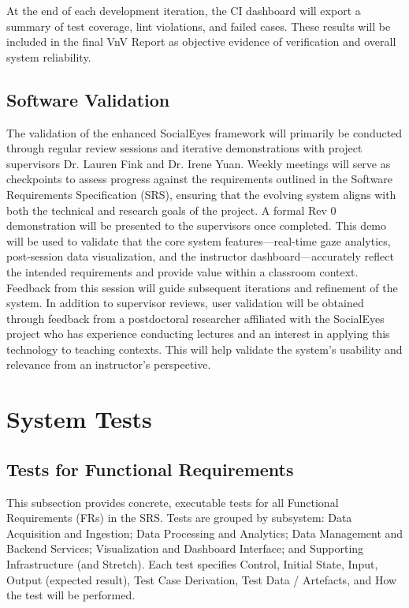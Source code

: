 \documentclass[12pt, titlepage]{article}
\begin{document}
At the end of each development iteration, the CI dashboard will export a summary of test coverage, lint violations, and failed cases. These results will be included in the final VnV Report as objective evidence of verification and overall system reliability.\\

\subsection{Software Validation}

The validation of the enhanced SocialEyes framework will primarily be conducted through regular review sessions and iterative demonstrations with project supervisors Dr. Lauren Fink and Dr. Irene Yuan. Weekly meetings will serve as checkpoints to assess progress against the requirements outlined in the Software Requirements Specification (SRS), ensuring that the evolving system aligns with both the technical and research goals of the project.
\newline
A formal Rev 0 demonstration will be presented to the supervisors once completed. This demo will be used to validate that the core system features—real-time gaze analytics, post-session data visualization, and the instructor dashboard—accurately reflect the intended requirements and provide value within a classroom context. Feedback from this session will guide subsequent iterations and refinement of the system.
In addition to supervisor reviews, user validation will be obtained through feedback from a postdoctoral researcher affiliated with the SocialEyes project who has experience conducting lectures and an interest in applying this technology to teaching contexts. This will help validate the system’s usability and relevance from an instructor’s perspective.
\newline

\section{System Tests}

\subsection{Tests for Functional Requirements}

This subsection provides concrete, executable tests for all Functional Requirements (FRs) in the SRS.
Tests are grouped by subsystem: Data Acquisition and Ingestion; Data Processing and Analytics; Data
Management and Backend Services; Visualization and Dashboard Interface; and Supporting Infrastructure
(and Stretch). Each test specifies Control, Initial State, Input, Output (expected result), Test Case
Derivation, Test Data / Artefacts, and How the test will be performed.
\end{document}
